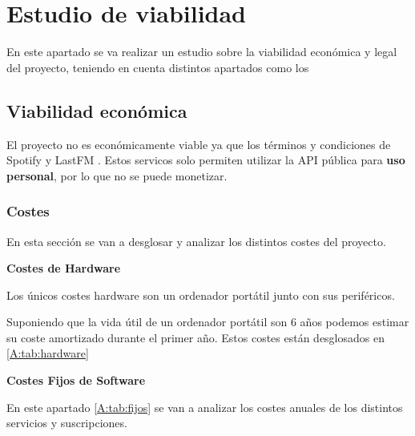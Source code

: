 \section{Estudio de viabilidad}

En este apartado se va realizar un estudio sobre la viabilidad económica y legal del proyecto, teniendo en cuenta distintos apartados como los

\subsection{Viabilidad económica}

El proyecto no es económicamente viable ya que los términos y condiciones de Spotify \cite{Spotify_terms:online} y LastFM \cite{A:Last_APITerms18:online}. Estos servicos solo permiten utilizar la API pública para \textbf{uso personal}, por lo que no se puede monetizar.

\subsubsection{Costes}

En esta sección se van a desglosar y analizar los distintos costes del proyecto.

\textbf{Costes de Hardware}

Los únicos costes hardware son un ordenador portátil junto con sus periféricos.

Suponiendo que la vida útil de un ordenador portátil son 6 años podemos estimar su coste amortizado durante el primer año. Estos costes están desglosados en \ref{A:tab:hardware}

\begin{table}[H]
    \caption{Costes Hardware}
    \label{A:tab:hardware}
\end{table}

\textbf{Costes Fijos de Software}

En este apartado \ref{A:tab:fijos} se van a analizar los costes anuales de los distintos servicios y suscripciones. 

